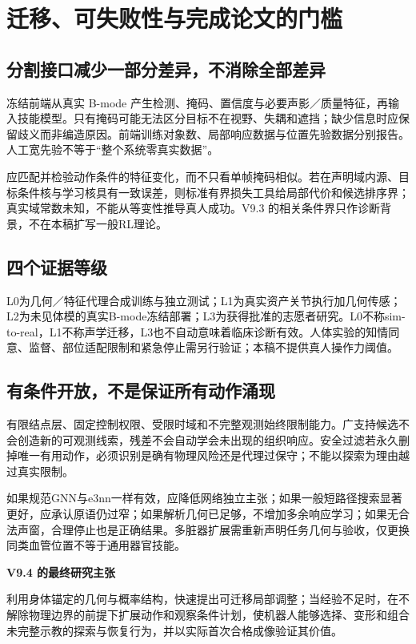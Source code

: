 \documentclass[UTF8,fontset=fandol,11pt,a4paper]{ctexart}
\theoremstyle{plain}
\theoremstyle{definition}
\theoremstyle{remark}
\numberwithin{equation}{section}
\begin{document}
\section{迁移、可失败性与完成论文的门槛}
\label{sec:limits}
\subsection{分割接口减少一部分差异，不消除全部差异}
冻结前端从真实 B-mode 产生检测、掩码、置信度与必要声影／质量特征，再输入技能模型。只有掩码可能无法区分目标不在视野、失耦和遮挡；缺少信息时应保留歧义而非编造原因。前端训练对象数、局部响应数据与位置先验数据分别报告。人工宽先验不等于“整个系统零真实数据”。

应匹配并检验动作条件的特征变化，而不只看单帧掩码相似。若在声明域内源、目标条件核与学习核具有一致误差，则标准有界损失工具给局部代价和候选排序界；真实域常数未知，不能从等变性推导真人成功。V9.3 的相关条件界只作诊断背景，不在本稿扩写一般RL理论。

\subsection{四个证据等级}
L0为几何／特征代理合成训练与独立测试；L1为真实资产关节执行加几何传感；L2为未见体模的真实B-mode冻结部署；L3为获得批准的志愿者研究。L0不称sim-to-real，L1不称声学迁移，L3也不自动意味着临床诊断有效。人体实验的知情同意、监督、部位适配限制和紧急停止需另行验证；本稿不提供真人操作力阈值。

\subsection{有条件开放，不是保证所有动作涌现}
有限结点层、固定控制权限、受限时域和不完整观测始终限制能力。广支持候选不会创造新的可观测线索，残差不会自动学会未出现的组织响应。安全过滤若永久删掉唯一有用动作，必须识别是确有物理风险还是代理过保守；不能以探索为理由越过真实限制。

如果规范GNN与e3nn一样有效，应降低网络独立主张；如果一般短路径搜索显著更好，应承认原语仍过窄；如果解析几何已足够，不增加多余响应学习；如果无合法声窗，合理停止也是正确结果。多脏器扩展需重新声明任务几何与验收，仅更换同类血管位置不等于通用器官技能。

\begin{corebox}
\textbf{V9.4 的最终研究主张}\par
利用身体锚定的几何与概率结构，快速提出可迁移局部调整；当经验不足时，在不解除物理边界的前提下扩展动作和观察条件计划，使机器人能够选择、变形和组合未完整示教的探索与恢复行为，并以实际首次合格成像验证其价值。
\end{corebox}
\end{document}
